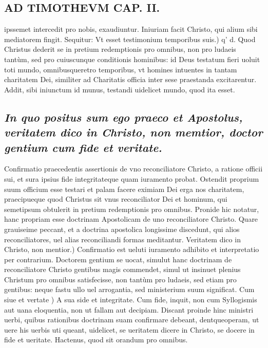 \documentclass{article}
\begin{document}
\begin{pages}
\section*{AD TIMOTHEVM CAP. II. }
\marginpar{[ p.69 ]}\pstart ipssemet intercedit pro nobis, exaudiuntur. Iniuriam facit Christo, qui alium sibi mediatorem fingit. Sequitur:  \pend\pstart Vt esset testimonium temporibus suis.) q' d. Quod Christus dederit se in pretium redemptionis pro omnibus, non pro ludaeis tantùm, sed pro cuiuscunque  conditionis hominibus: id Deus testatum fieri uoluit toti mundo, omnibusqueretro temporibus, vt homines intuentes in tantam charitatem Dei, similiter ad Charitatis officia inter sese praestanda excitarentur. Addit, sibi iniunctum id munus, testandi uidelicet mundo, quod ita esset.  \pend
{}
{}
\subsection*{\textit{In quo positus sum ego praeco et Apostolus, veritatem dico in Christo, non memtior, doctor gentium cum fide et veritate. }}\pstart Confirmatio praecedentis assertionis de vno reconciliatore Christo, a ratione officii sui, et sura ipsius fide integritateque  quam iuramento probat. Ostendit proprium suum officium esse testari et palam facere eximiam Dei erga nos charitatem, praecipueque  quod Christus sit vnus reconciliator Dei et hominum, qui semetipsum obtulerit in pretium redemptionis pro omnibus. Pronide hic notatur, hanc propriam esse doctrinam Apostolicam de uno reconciliatore Christo. Quare grauiseime peccant, et a doctrina apostolica longissime discedunt, qui alios reconciliatores, uel alias reconciliandi formas meditantur.  \pend\pstart Veritatem dico in Christo, non mentior.) Confirmatio est ueluti iuramento adhibito et interpretatio per contrarium. Doctorem gentium se uocat, simulut hanc doctrinam de reconciliatore Christo gentibus magis commendet, simul ut insinuet plenius Christum pro omnibus satisfecisse, non tantùm pro ludaeis, sed etiam pro gentibus: neque fastu ullo uel arrogantia, sed ministerium suum significat.  \pend\pstart Cum siue et vertate ) A sua side et integritate. Cum fide, inquit, non cum Syllogismis aut uana eloquentia, non ut fallam aut decipiam. Discant proinde hinc ministri uerbi, quibus rationibus doctrinam suam confirmare debeant, dentqueoperam, ut uere his uerbis uti queant, uidelicet, se ueritatem dicere in Christo, se docere in fide et ueritate. Hactenus, quod sit orandum pro omnibus.  \pend
{}
{}

\end{pages}
\end{document}
